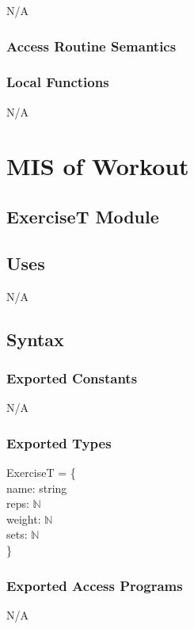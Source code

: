 \documentclass[12pt, titlepage]{article}
\begin{document}
N/A

\subsubsection{Access Routine Semantics}


\subsubsection{Local Functions}

N/A

\section{MIS of Workout} \label{Module} 

\subsection{ExerciseT Module}

\subsection{Uses}

N/A

\subsection{Syntax}

\subsubsection{Exported Constants}

N/A

\subsubsection{Exported Types}
ExerciseT = \{\\
name: string\\
reps: $\mathbb{N}$\\
weight: $\mathbb{N}$\\
sets: $\mathbb{N}$\\
\}

\subsubsection{Exported Access Programs}

N/A
\end{document}
